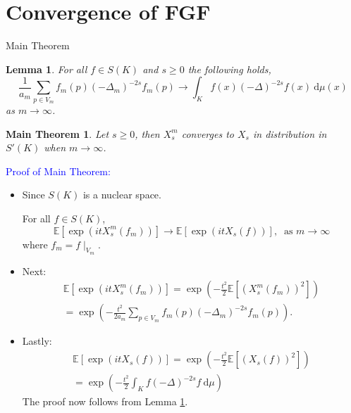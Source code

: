 \documentclass{beamer}
\newcounter{chapCount}
\newtheorem{lem}[theorems]{Lemma}
\newtheorem{mainTheorem}[theorems]{Main Theorem}
\newcommand{\e}{\mathbb{E}}
\newcommand{\dd}{\ \text{d}}
\begin{document}
\section{Convergence of FGF}

\begin{frame}{Main Theorem}
	\vspace{1em}
	\setcounter{chapCount}{4}
	\setcounter{theorems}{2}
	\begin{lem}\label{convergence}
		For all $f \in S(K)$ and $s \geq 0$ the following holds,
		\begin{equation}
			\frac{1}{a_m} \sum_{p \in V_m} f_m(p) (-\Delta_m)^{-2s}f_m(p) \to \int_{K}f(x)(-\Delta)^{-2s}f(x) \dd \mu(x)
		\end{equation}
		as $m \to \infty$.
	\end{lem}
	\pause
	
	\vspace{1em}
	\setcounter{theorems}{0}
	\begin{mainTheorem}
		Let $s \geq 0$, then $X_{s}^{m}$ converges to $X_s$ in distribution in $S'(K)$ when $m \to \infty$.
	\end{mainTheorem}
\end{frame}

\begin{frame}
	\textcolor{blue}{Proof of Main Theorem: }
	
	
	\begin{itemize}
		\item<1-> Since $S(K)$ is a nuclear space.
		
		For all $f \in S(K)$,  
		$$\e \left[\exp \left(itX_{s}^{m}(f_m) \right)\right] \to \e \left[\exp\left(itX_{s}(f)\right)\right], \ \text{ as } m \to \infty$$
		where $f_m = f \mid_{V_m}$. 
		
		\item<2-> Next: 
		\begin{multline}
			\e \left[\exp\left(itX_{s}^{m}(f_m)\right)\right] = \exp \left(-\frac{t^2}{2} \e \left[ \left(X_{s}^{m}(f_m) \right)^2\right]\right) \\
			= \exp \left(-\frac{t^2}{2a_m} \sum_{p \in V_m} f_m(p) (-\Delta_m)^{-2s} f_m(p)\right).
		\end{multline}
	\end{itemize}	
	
	\end{frame}
		
	\begin{frame}

	\begin{itemize}
		\item<1-> Lastly: 
		\begin{multline}
			\e \left[\exp(i t X_{s}(f))\right] = \exp\left(-\frac{t^2}{2} \e \left[(X_{s}(f))^2\right]\right) \\
			=\exp\left(-\frac{t^2}{2}\int_{K} f (-\Delta)^{-2s}f \dd \mu\right)
		\end{multline} 
		The proof now follows from Lemma \ref{convergence}.
	\end{itemize}
\end{frame}
\end{document}
